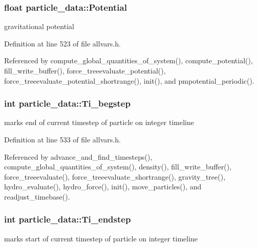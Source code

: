 \hypertarget{structparticle__data_a9d45a0cefc6121831905e169072550d0}{
\subsubsection[{Potential}]{\setlength{\rightskip}{0pt plus 5cm}float {\bf particle\_\-data::Potential}}}
\label{structparticle__data_a9d45a0cefc6121831905e169072550d0}
gravitational potential 

Definition at line 523 of file allvars.h.



Referenced by compute\_\-global\_\-quantities\_\-of\_\-system(), compute\_\-potential(), fill\_\-write\_\-buffer(), force\_\-treeevaluate\_\-potential(), force\_\-treeevaluate\_\-potential\_\-shortrange(), init(), and pmpotential\_\-periodic().

\hypertarget{structparticle__data_a6c9f057d234839cecaaeffc87b7a9794}{
\subsubsection[{Ti\_\-begstep}]{\setlength{\rightskip}{0pt plus 5cm}int {\bf particle\_\-data::Ti\_\-begstep}}}
\label{structparticle__data_a6c9f057d234839cecaaeffc87b7a9794}
marks end of current timestep of particle on integer timeline 

Definition at line 533 of file allvars.h.



Referenced by advance\_\-and\_\-find\_\-timesteps(), compute\_\-global\_\-quantities\_\-of\_\-system(), density(), fill\_\-write\_\-buffer(), force\_\-treeevaluate(), force\_\-treeevaluate\_\-shortrange(), gravity\_\-tree(), hydro\_\-evaluate(), hydro\_\-force(), init(), move\_\-particles(), and readjust\_\-timebase().

\hypertarget{structparticle__data_a9bf2c52c7378a961222d9fe8faa9c208}{
\subsubsection[{Ti\_\-endstep}]{\setlength{\rightskip}{0pt plus 5cm}int {\bf particle\_\-data::Ti\_\-endstep}}}
\label{structparticle__data_a9bf2c52c7378a961222d9fe8faa9c208}
marks start of current timestep of particle on integer timeline 

